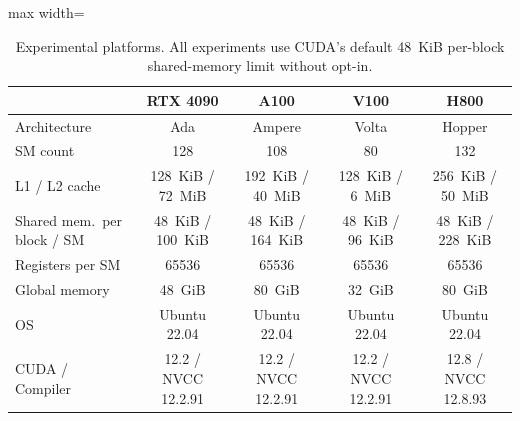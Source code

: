 \documentclass[acmsmall,review,anonymous,screen]{acmart}
\newif\ifrevmarkup %
\DeclareRobustCommand{\revRone}[1]{\ifrevmarkup{\color{revRone}\hypersetup{allcolors=revRone}#1}\else#1\fi} %
\providecommand{\DIFaddbeginFL}{} %
\providecommand{\DIFaddendFL}{} %
\providecommand{\DIFdelbeginFL}{} %
\providecommand{\DIFdelendFL}{} %
\newcommand{\DIFscaledelfig}{0.5}
\newlength{\DIFdelgraphicswidth} %
\newlength{\DIFdelgraphicsheight} %
\newcommand{\DIFaddincludegraphics}[2][]{{\color{blue}\fbox{\DIFOincludegraphics[#1]{#2}}}} %
\newcommand{\DIFdelincludegraphics}[2][]{%
\sbox{\DIFdelgraphicsbox}{\DIFOincludegraphics[#1]{#2}}%
\settoboxwidth{\DIFdelgraphicswidth}{\DIFdelgraphicsbox} %
\settoboxtotalheight{\DIFdelgraphicsheight}{\DIFdelgraphicsbox} %
\scalebox{\DIFscaledelfig}{%
\parbox[b]{\DIFdelgraphicswidth}{\usebox{\DIFdelgraphicsbox}\\[-\baselineskip] \rule{\DIFdelgraphicswidth}{0em}}\llap{\resizebox{\DIFdelgraphicswidth}{\DIFdelgraphicsheight}{%
\setlength{\unitlength}{\DIFdelgraphicswidth}%
\begin{picture}(1,1)%
\thicklines\linethickness{2pt} %
{\color[rgb]{1,0,0}\put(0,0){\framebox(1,1){}}}%
{\color[rgb]{1,0,0}\put(0,0){\line( 1,1){1}}}%
{\color[rgb]{1,0,0}\put(0,1){\line(1,-1){1}}}%
\end{picture}%
}\hspace*{3pt}}} %
} %
\DeclareRobustCommand{\DIFaddbeginFL}{\DIFOaddbeginFL \let\includegraphics\DIFaddincludegraphics} %
\DeclareRobustCommand{\DIFaddendFL}{\DIFOaddendFL \let\includegraphics\DIFOincludegraphics} %
\DeclareRobustCommand{\DIFdelbeginFL}{\DIFOdelbeginFL \let\includegraphics\DIFdelincludegraphics} %
\DeclareRobustCommand{\DIFdelendFL}{\DIFOaddendFL \let\includegraphics\DIFOincludegraphics} %
\begin{document}
\begin{table}[tbp]
  \centering
  \caption{Experimental platforms. All experiments use CUDA's default \SI{48}{KiB} per-block shared-memory limit without opt-in.}
  \label{tab:platforms}
  \scriptsize
  \begin{adjustbox}{max width=\linewidth}
  \DIFdelbeginFL %
\DIFdelendFL \DIFaddbeginFL \begin{tabular}{lcccc}
    \DIFaddendFL \toprule
     & RTX 4090 & A100 & V100 \DIFaddbeginFL & \revRone{H800} \DIFaddendFL \\
    \midrule
    Architecture & Ada & Ampere & Volta \DIFaddbeginFL & \revRone{Hopper} \DIFaddendFL \\
    SM count & 128 & 108 & 80 \DIFaddbeginFL & \revRone{132} \DIFaddendFL \\
    L1 / L2 cache & \SI{128}{KiB} / \SI{72}{MiB} & \SI{192}{KiB} / \SI{40}{MiB} & \SI{128}{KiB} / \SI{6}{MiB} \DIFaddbeginFL & \revRone{\SI{256}{KiB} / \SI{50}{MiB}} \DIFaddendFL \\
    Shared mem.\ per block / SM & \SI{48}{KiB} / \SI{100}{KiB} & \SI{48}{KiB} / \SI{164}{KiB} & \SI{48}{KiB} / \SI{96}{KiB} \DIFaddbeginFL & \revRone{\SI{48}{KiB} / \SI{228}{KiB}} \DIFaddendFL \\
    Registers per SM & 65536 & 65536 & 65536 \DIFaddbeginFL & \revRone{65536} \DIFaddendFL \\
    Global memory & \SI{48}{GiB} & \SI{80}{GiB} & \SI{32}{GiB} \DIFaddbeginFL & \revRone{\SI{80}{GiB}} \DIFaddendFL \\
    OS & Ubuntu 22.04 & Ubuntu 22.04 & Ubuntu 22.04 \DIFaddbeginFL & \revRone{Ubuntu 22.04} \DIFaddendFL \\
    CUDA / Compiler & 12.2 / NVCC 12.2.91 & 12.2 / NVCC 12.2.91 & 12.2 / NVCC 12.2.91 \DIFaddbeginFL & \revRone{12.8 / NVCC 12.8.93} \DIFaddendFL \\
    \bottomrule
  \end{tabular}
  \end{adjustbox}
\end{table}
\end{document}
